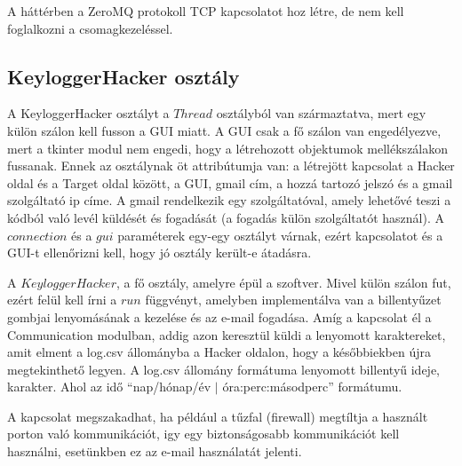 \documentclass[12pt,a4paper,oneside]{report}
\begin{document}
A háttérben a ZeroMQ protokoll TCP kapcsolatot hoz létre, de nem kell foglalkozni a csomagkezeléssel.

\subsection{KeyloggerHacker osztály}\label{subsubsec:keyloggerclass}
A KeyloggerHacker osztályt a $Thread$ osztályból van származtatva, mert egy külön szálon kell fusson a GUI miatt. A GUI csak a fő szálon van engedélyezve, mert a tkinter modul nem engedi, hogy a létrehozott objektumok mellékszálakon fussanak. Ennek az osztálynak öt attribútumja van: a létrejött kapcsolat a Hacker oldal és a Target oldal között, a GUI, gmail cím, a hozzá tartozó jelszó és a gmail szolgáltató ip címe. A gmail rendelkezik egy szolgáltatóval, amely lehetővé teszi a kódból való levél küldését és fogadását (a fogadás külön szolgáltatót használ). A $connection$ és a $gui$ paraméterek egy-egy osztályt várnak, ezért kapcsolatot és a GUI-t ellenőrizni kell, hogy jó osztály került-e átadásra.

A $KeyloggerHacker$, a fő osztály, amelyre épül a szoftver. Mivel külön szálon fut, ezért felül kell írni a $run$ függvényt, amelyben implementálva van a billentyűzet gombjai lenyomásának a kezelése és az e-mail fogadása. Amíg a kapcsolat él a Communication modulban, addig azon keresztül küldi a lenyomott karaktereket, amit elment a log.csv állományba a Hacker oldalon, hogy a későbbiekben újra megtekinthető legyen. A log.csv állomány formátuma lenyomott billentyű ideje, karakter. Ahol az idő ``nap/hónap/év $|$ óra:perc:másodperc'' formátumu.

A kapcsolat megszakadhat, ha például a tűzfal (firewall) megtíltja a használt porton való kommunikációt, igy egy biztonságosabb kommunikációt kell használni, esetünkben ez az e-mail használatát jelenti.
\end{document}
